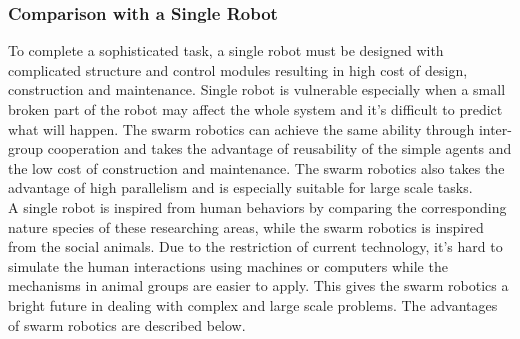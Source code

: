 \subsubsection*{Comparison with a Single Robot}
To complete a sophisticated task, a single robot must be designed with complicated structure and control modules resulting in high cost of design, construction and maintenance. Single robot is vulnerable especially when a small broken part of the robot may affect the whole system and it's difficult to predict what will happen. The swarm robotics can achieve the same ability through inter-group cooperation and takes the advantage of reusability of the simple agents and the low cost of construction and maintenance. The swarm robotics also takes the advantage of high parallelism and is especially suitable for large scale tasks.\\
A single robot is inspired from human behaviors by comparing the corresponding nature species of these researching areas, while the swarm robotics is inspired from the social animals. Due to the restriction of current technology, it's hard to simulate the human interactions using machines or computers while the mechanisms in animal groups are easier to apply. This gives the swarm robotics a bright future in dealing with complex and large scale problems. The advantages of swarm robotics are described below.
